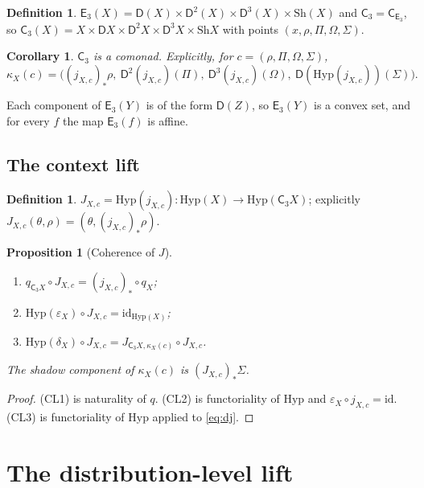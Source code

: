 \documentclass[11pt]{article}
\newtheorem{proposition}[theorem]{Proposition}
\newtheorem{corollary}[theorem]{Corollary}
\theoremstyle{definition}
\newtheorem{definition}[theorem]{Definition}
\theoremstyle{remark}
\newcommand{\D}{\mathsf{D}}
\newcommand{\Hyp}{\mathrm{Hyp}}
\newcommand{\Sh}{\mathrm{Sh}}
\newcommand{\C}{\mathsf{C}}
\newcommand{\E}{\mathsf{E}}
\newcommand{\id}{\mathrm{id}}
\begin{document}
\begin{definition}
$\E_3(X)=\D(X)\times\D^2(X)\times\D^3(X)\times\Sh(X)$ and
$\C_3=\C_{\E_3}$, so $\C_3(X)=X\times\D X\times\D^2X\times\D^3X\times\Sh X$ with points
$(x,\rho,\Pi,\Omega,\Sigma)$.
\end{definition}

\begin{corollary}\label{cor:C3}
$\C_3$ is a comonad. Explicitly, for $c=(\rho,\Pi,\Omega,\Sigma)$,
\[
\kappa_X(c)=\big((j_{X,c})_*\rho,\ \D^2(j_{X,c})(\Pi),\ \D^3(j_{X,c})(\Omega),\
\D(\Hyp(j_{X,c}))(\Sigma)\big).
\]
\end{corollary}

Each component of $\E_3(Y)$ is of the form $\D(Z)$, so $\E_3(Y)$ is a convex set, and for every $f$
the map $\E_3(f)$ is affine.

\subsection{The context lift}

\begin{definition}
$J_{X,c}=\Hyp(j_{X,c})\colon\Hyp(X)\to\Hyp(\C_3X)$; explicitly
$J_{X,c}(\theta,\rho)=(\theta,(j_{X,c})_*\rho)$.
\end{definition}

\begin{proposition}[Coherence of $J$]\label{prop:CL}
\begin{enumerate}[label=(CL\arabic*)]
\item $q_{\C_3X}\circ J_{X,c}=(j_{X,c})_*\circ q_X$;
\item $\Hyp(\varepsilon_X)\circ J_{X,c}=\id_{\Hyp(X)}$;
\item $\Hyp(\delta_X)\circ J_{X,c}=J_{\C_3X,\kappa_X(c)}\circ J_{X,c}$.
\end{enumerate}
The shadow component of $\kappa_X(c)$ is $(J_{X,c})_*\Sigma$.
\end{proposition}
\begin{proof}
(CL1) is naturality of $q$. (CL2) is functoriality of $\Hyp$ and
$\varepsilon_X\circ j_{X,c}=\id$. (CL3) is functoriality of $\Hyp$ applied to \eqref{eq:dj}.
\end{proof}

\section{The distribution-level lift}
\end{document}
